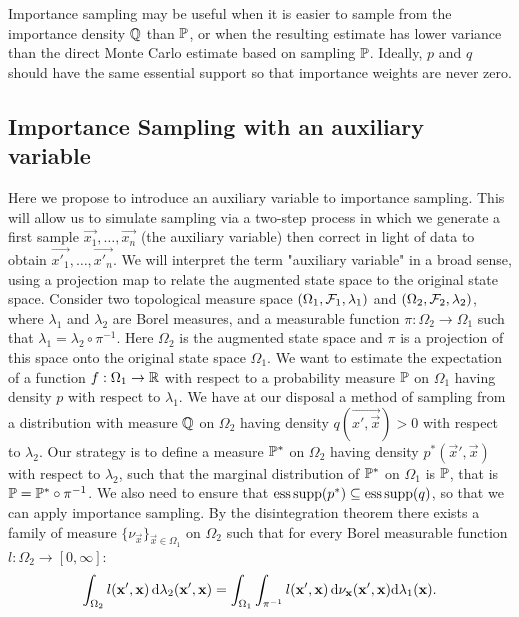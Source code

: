 Importance sampling may be useful when it is easier to sample from the importance density $\Q$ than $\P$, or when the resulting estimate has lower variance than the direct Monte Carlo estimate based on sampling $\P$. Ideally, $p$ and $q$ should have the same essential support so that importance weights are never zero.

\subsection{Importance Sampling with an auxiliary variable}

Here we propose to introduce an auxiliary variable to importance sampling. This will allow us to simulate sampling via a two-step process in which we generate a first sample $\vec{x_1}, \dots, \vec{x_n}$ (the auxiliary variable) then correct in light of data to obtain $\vec{x'_1}, \dots, \vec{x'_n}$. We will interpret the term "auxiliary variable" in a broad sense, using a projection map to relate the augmented state space to the original state space. Consider two topological measure space $(\Omega_1, \F_1, \lambda_1)$ and $(\Omega_2, \F_2, \lambda_2)$, where $\lambda_1$ and $\lambda_2$ are Borel measures, and a measurable function $\pi: \Omega_2 \rightarrow \Omega_1$ such that $\lambda_1 = \lambda_2 \circ \pi^{-1}$. Here $\Omega_2$ is the augmented state space and $\pi$ is a projection of this space onto the original state space $\Omega_1$. We want to estimate the expectation of a function $f:\Omega_1 \rightarrow \Real$ with respect to a probability measure $\P$ on $\Omega_1$ having density $p$ with respect to $\lambda_1$. We have at our disposal a method of sampling from a distribution with measure $\Q$ on $\Omega_2$ having density $q(\vec{x', \vec{x}}) > 0$ with respect to $\lambda_2$. Our strategy is to define a measure $\P^*$ on $\Omega_2$ having density $p^*(\vec{x}', \vec{x})$ with respect to $\lambda_2$, such that the marginal distribution of $\P^*$ on $\Omega_1$ is $\P$, that is $\P = \P^* \circ \pi^{-1}$. We also need to ensure that $\esssupp(p^*) \subseteq \esssupp(q)$, so that we can apply importance sampling.
By the disintegration theorem there exists a family of measure $\{ \nu_{\vec{x}} \}_{\vec{x}\in\Omega_1}$ on $\Omega_2$ such that for every Borel measurable function $l:\Omega_2 \rightarrow [0, \infty]$:
\begin{equation*}
    \int_{\Omega_2} l(\vec{x'}, \vec{x}) \d \lambda_2(\vec{x'}, \vec{x}) = \int_{\Omega_1}\int_{\pi^{-1}} l(\vec{x', \vec{x}}) \d \nu_\vec{x}(\vec{x', \vec{x}}) \D \lambda_1(\vec{x}).
\end{equation*}

